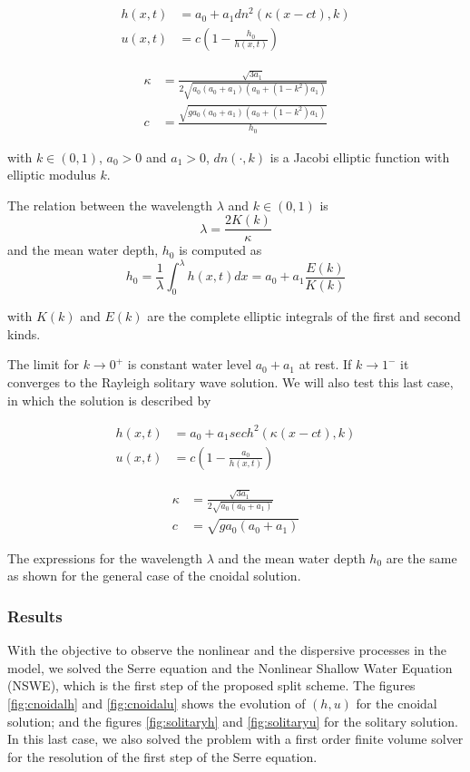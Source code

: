 \begin{align*}
    h(x,t) &= a_0 + a_1 dn^2(\kappa(x-ct),k) \\
    u(x,t) &= c\left( 1 - \frac{h_0}{h(x,t)}\right)
\end{align*}

\begin{align*}
    \kappa &= \frac{\sqrt{3a_1}}{2\sqrt{a_0(a_0+a_1)(a_0+(1-k^2)a_1)}} \\
    c &= \frac{\sqrt{g a_0(a_0+a_1)(a_0+(1-k^2)a_1)}}{h_0}
\end{align*}

\noindent with $k\in(0,1)$, $a_0>0$ and $a_1>0$, $dn(\cdot,k)$ is a Jacobi elliptic function with elliptic modulus $k$.

\indent The relation between the wavelength $\lambda$ and $k\in(0,1)$ is $$\lambda = \frac{2K(k)}{\kappa}$$ and the mean water depth, $h_0$ is computed as $$h_0 = \frac{1}{\lambda}\int_{0}^\lambda h(x,t)dx = a_0 + a_1 \frac{E(k)}{K(k)}$$

\noindent with $K(k)$ and $E(k)$ are the complete elliptic integrals of the first and second kinds.

\indent The limit for $k\to0^+$ is constant water level $a_0+a_1$ at rest. If $k\to1^-$ it converges to the Rayleigh solitary wave solution. We will also test this last case, in which the solution is described by

\begin{align*}
    h(x,t) &= a_0 + a_1 sech^2(\kappa(x-ct),k) \\
    u(x,t) &= c\left( 1 - \frac{a_0}{h(x,t)}\right)
\end{align*}

\begin{align*}
    \kappa &= \frac{\sqrt{3a_1}}{2\sqrt{a_0(a_0+a_1)}} \\
    c &= \sqrt{g a_0(a_0+a_1)}
\end{align*}

\indent The expressions for the wavelength $\lambda$ and the mean water depth $h_0$ are the same as shown for the general case of the cnoidal solution.

\subsubsection{Results}

\indent With the objective to observe the nonlinear and the dispersive processes in the model, we solved the Serre equation and the Nonlinear Shallow Water Equation (NSWE), which is the first step of the proposed split scheme. The figures \ref{fig:cnoidalh} and \ref{fig:cnoidalu} shows the evolution of $(h,u)$ for the cnoidal solution; and the figures \ref{fig:solitaryh} and \ref{fig:solitaryu} for the solitary solution. In this last case, we also solved the problem with a first order finite volume solver for the resolution of the first step of the Serre equation.

